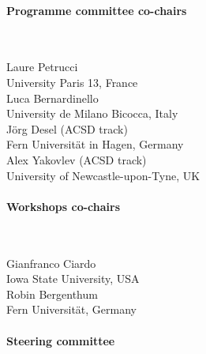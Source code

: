 \documentclass[10pt]{article}
\newcommand{\styleUniv}[1]{\textcolor{black!75}{#1}}
\begin{document}
\setlength{\columnsep}{0cm}
\begin{multicols}{2}
\paragraph{Programme committee co-chairs}$ $
\vspace*{0.25em}

\noindent Laure Petrucci \\
\indent \styleUniv{University Paris 13, France} \\
\noindent Luca Bernardinello \\
\indent \styleUniv{University de Milano Bicocca, Italy} \\
\noindent Jörg Desel (ACSD track) \\
\indent \styleUniv{Fern Universität in Hagen, Germany} \\
\noindent Alex Yakovlev (ACSD track) \\
\indent \styleUniv{University of Newcastle-upon-Tyne, UK}

\paragraph*{Workshops co-chairs} $ $
\vspace*{0.25em}

\noindent Gianfranco Ciardo \\
\indent \styleUniv{Iowa State University, USA} \\
\noindent Robin Bergenthum \\
\indent \styleUniv{Fern Universität, Germany}



\columnbreak

\paragraph{Steering committee}\mbox{}
\vspace*{0.25em}


\end{multicols}
\end{document}
